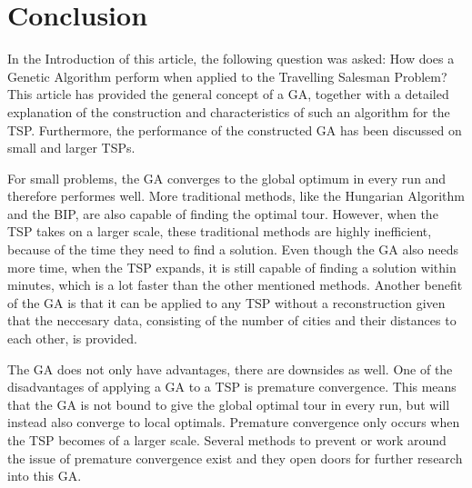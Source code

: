 \section{Conclusion}
\par
In the Introduction of this article, the following question was asked: How does a Genetic Algorithm perform when applied to the Travelling Salesman Problem?
This article has provided the general concept of a GA, together with a detailed explanation of the construction and characteristics of such an algorithm for the TSP. Furthermore, the performance of the constructed GA has been discussed on small and larger TSPs. 

\par
For small problems, the GA converges to the global optimum in every run and therefore performes well. More traditional methods, like the Hungarian Algorithm and the BIP, are also capable of finding the optimal tour. However, when the TSP takes on a larger scale, these traditional methods are highly inefficient, because of the time they need to find a solution. Even though the GA also needs more time, when the TSP expands, it is still capable of finding a solution within minutes, which is a lot faster than the other mentioned methods. Another benefit of the GA is that it can be applied to any TSP without a reconstruction given that the neccesary data, consisting of the number of cities and their distances to each other, is provided. 

\par
The GA does not only have advantages, there are downsides as well. One of the disadvantages of applying a GA to a TSP is premature convergence. This means that the GA is not bound to give the global optimal tour in every run, but will instead also converge to local optimals. Premature convergence only occurs when the TSP becomes of a larger scale. Several methods to prevent or work around the issue of premature convergence exist \cite{Premconvergence} and they open doors for further research into this GA. 

